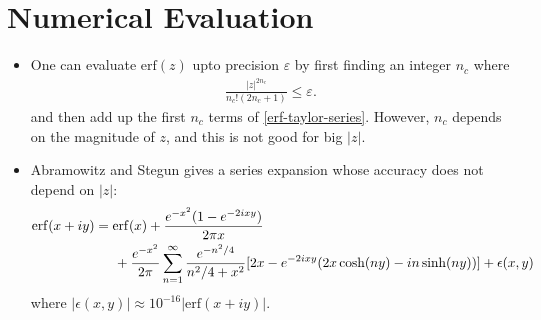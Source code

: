 \documentclass[10pt]{article}
\newcommand{\erf}{\mathrm{erf}}
\begin{document}
  \section{Numerical Evaluation}\label{sec:numerical_evaluation} %
  \begin{itemize}
    \item One can evaluate $\erf(z)$ upto precision $\varepsilon$ by first finding an integer $n_c$ where
    \begin{align*}
      \frac{|z|^{2n_c}}{n_c!(2n_c+1)} \leq \varepsilon.
    \end{align*}
    and then add up the first $n_c$ terms of \eqref{erf-taylor-series}. However, $n_c$ depends on the magnitude of $z$, and this is not good for big $|z|$.
    
    \item Abramowitz and Stegun gives a series expansion whose accuracy does not depend on $|z|$:
    \begin{align}
      \erf(x+iy)
      &= \erf(x) + \frac{e^{-x^2}(1 - e^{-2ixy})}{2\pi x} \notag\\
      &\phantom{\ = \ }+ \frac{e^{-x^2}}{2\pi} \sum_{n=1}^\infty \frac{e^{-n^2/4}}{n^2/4 + x^2} [2x - e^{-2ixy}(2x \cosh(ny) - in \sinh(ny))] + \epsilon(x,y) \label{erf-as}
    \end{align}
    where $|\epsilon(x,y)| \approx 10^{-16} |\erf(x+iy)|$.
    

\end{itemize}
\end{document}
